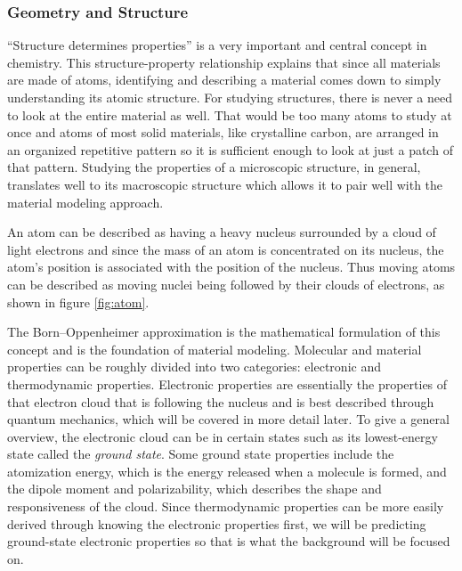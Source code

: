 \documentclass[12pt, abstract = true]{scrartcl}
\begin{document}
\subsubsection{Geometry and Structure}
``Structure determines properties'' is a very important and central concept in chemistry. 
This structure-property relationship explains that since all materials are made of atoms, identifying 
and describing a material comes down to simply understanding its atomic structure. For studying 
structures, there is never a need to look at the entire material as well. That would be too many 
atoms to study at once and atoms of most solid materials, like crystalline carbon, are arranged in 
an organized repetitive pattern so it is sufficient enough to look at just a patch of that pattern. 
Studying the properties of a microscopic structure, in general, translates well to its macroscopic 
structure which allows it to pair well with the material modeling approach.


An atom can be described as having a heavy nucleus surrounded by a cloud of light 
electrons and since the mass of an atom is concentrated on its nucleus, the atom's 
position is associated with the position of the nucleus. Thus moving atoms can be described
as moving nuclei being followed by their clouds of electrons, as shown in figure \ref{fig:atom}. 



The Born–Oppenheimer approximation is the mathematical formulation of this concept and 
is the foundation of material modeling. Molecular and material properties can be 
roughly divided into two categories: electronic and thermodynamic properties. Electronic 
properties are essentially the properties of that electron cloud that is following the 
nucleus and is best described through quantum mechanics, which will be covered in more 
detail later. To give a general overview, the electronic cloud can be in certain states 
such as its lowest-energy state called the \emph{ground state}. Some ground state properties include the atomization energy, which is the energy released when a molecule is formed, and the 
dipole moment and polarizability, which describes the shape and responsiveness of the
cloud. Since thermodynamic properties can be more easily derived through knowing the electronic 
properties first, we will be predicting ground-state electronic properties 
so that is what the background will be focused on. 
\end{document}
